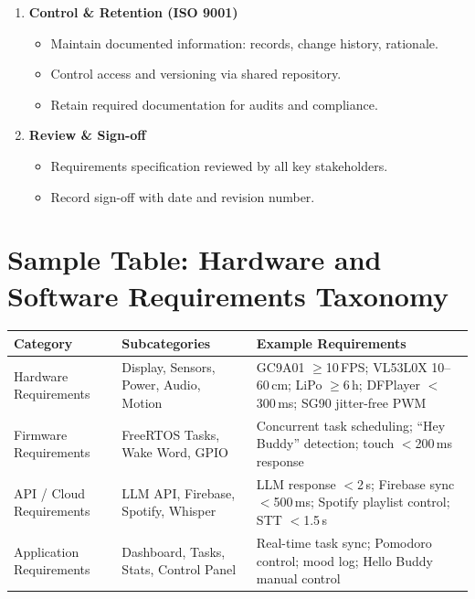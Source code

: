 \documentclass[12pt,a4paper]{article}
\begin{document}
\begin{enumerate}[leftmargin=*]
\item \textbf{Control \& Retention (ISO 9001)}
    \begin{itemize}
    \item Maintain documented information: records, change history,
          rationale.
    \item Control access and versioning via shared repository.
    \item Retain required documentation for audits and compliance.
    \end{itemize}

\item \textbf{Review \& Sign-off}
    \begin{itemize}
    \item Requirements specification reviewed by all key stakeholders.
    \item Record sign-off with date and revision number.
    \end{itemize}
\end{enumerate}

\newpage
\section*{Sample Table: Hardware and Software Requirements Taxonomy}

\begin{center}
\begin{tabular}{|L{0.23\textwidth}|L{0.30\textwidth}|L{0.37\textwidth}|}
\hline
\textbf{Category} & \textbf{Subcategories} &
\textbf{Example Requirements} \\ \hline
Hardware Requirements &
Display, Sensors, Power, Audio, Motion &
GC9A01 $\geq$10\,FPS; VL53L0X 10--60\,cm; LiPo $\geq$6\,h;
DFPlayer $<$300\,ms; SG90 jitter-free PWM \\ \hline
Firmware Requirements &
FreeRTOS Tasks, Wake Word, GPIO &
Concurrent task scheduling; ``Hey Buddy'' detection;
touch $<$200\,ms response \\ \hline
API / Cloud Requirements &
LLM API, Firebase, Spotify, Whisper &
LLM response $<$2\,s; Firebase sync $<$500\,ms;
Spotify playlist control; STT $<$1.5\,s \\ \hline
Application Requirements &
Dashboard, Tasks, Stats, Control Panel &
Real-time task sync; Pomodoro control; mood log;
Hello Buddy manual control \\ \hline
\end{tabular}
\end{center}
\end{document}
